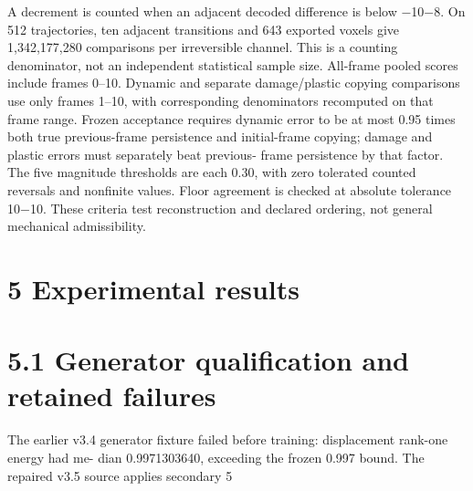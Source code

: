 \documentclass[11pt]{article}
\begin{document}
A decrement is counted when an adjacent decoded difference is below \ensuremath{-}10\ensuremath{-}8. On 512 trajectories,
ten adjacent transitions and 643 exported voxels give 1,342,177,280 comparisons per irreversible
channel. This is a counting denominator, not an independent statistical sample size.
All-frame pooled scores include frames 0–10. Dynamic and separate damage/plastic copying
comparisons use only frames 1–10, with corresponding denominators recomputed on that frame
range. Frozen acceptance requires dynamic error to be at most 0.95 times both true previous-frame
persistence and initial-frame copying; damage and plastic errors must separately beat previous-
frame persistence by that factor. The five magnitude thresholds are each 0.30, with zero tolerated
counted reversals and nonfinite values. Floor agreement is checked at absolute tolerance 10\ensuremath{-}10.
These criteria test reconstruction and declared ordering, not general mechanical admissibility.

\section*{5 Experimental results}


\section*{5.1 Generator qualification and retained failures}

The earlier v3.4 generator fixture failed before training: displacement rank-one energy had me-
dian 0.9971303640, exceeding the frozen 0.997 bound. The repaired v3.5 source applies secondary
5
\end{document}
